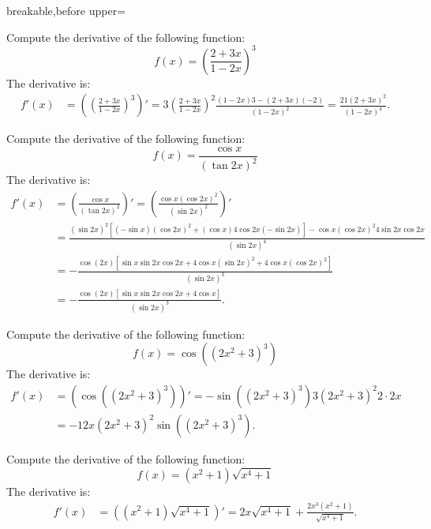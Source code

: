 \begin{dispListing*}{breakable,before upper=}
\begin{exercise}
  Compute the derivative of the following function:
  \begin{equation*}
    f(x)=\left(\frac{2+3x}{1-2x}\right)^3
  \end{equation*}
\tcblower
  The derivative is:
  \begin{align*}
    f'(x) &= \left( \left(\frac{2+3x}{1-2x}\right)^3 \right)'
    = 3 \left(\frac{2+3x}{1-2x}\right)^2 \frac{(1-2x)3-(2+3x)(-2)}{(1-2x)^2}
    = \frac{21(2+3x)^2}{(1-2x)^4}.
  \end{align*}
\end{exercise}

\begin{exercise}
  Compute the derivative of the following function:
  \begin{equation*}
    f(x)=\frac{\cos x}{(\tan 2x)^2}
  \end{equation*}
\tcblower
  The derivative is:
  \begin{align*}
    f'(x) &= \left( \frac{\cos x}{(\tan 2x)^2} \right)'
    = \left( \frac{\cos x (\cos 2x)^2}{(\sin 2x)^2} \right)'\\
    &= \frac{(\sin 2x)^2 [(-\sin x)(\cos 2x)^2+(\cos x)4\cos 2x (-\sin 2x)]
       - \cos x (\cos 2x)^2 4\sin 2x \cos 2x}{(\sin 2x)^4}\\
    &= -\frac{\cos(2x) [\sin x \sin 2x \cos 2x+ 4\cos x(\sin 2x)^2
       + 4 \cos x (\cos 2x)^2]}{(\sin 2x)^3}\\
    &= -\frac{\cos(2x) [\sin x \sin 2x \cos 2x+ 4\cos x]}{(\sin 2x)^3}.
  \end{align*}
\end{exercise}

\begin{exercise}
  Compute the derivative of the following function:
  \begin{equation*}
    f(x)=\cos((2x^2+3)^3)
  \end{equation*}
\tcblower
  The derivative is:
  \begin{align*}
    f'(x) &= \left( \cos((2x^2+3)^3) \right)'
    =-\sin((2x^2+3)^3) 3(2x^2+3)^2 2\cdot 2x\\
    &=-12x(2x^2+3)^2\sin((2x^2+3)^3).
  \end{align*}
\end{exercise}

\begin{exercise}
  Compute the derivative of the following function:
  \begin{equation*}
    f(x)=(x^2+1)\sqrt{x^4+1}
  \end{equation*}
\tcblower
  The derivative is:
  \begin{align*}
    f'(x) &= \left( (x^2+1)\sqrt{x^4+1} \right)'
    = 2x\sqrt{x^4+1} + \frac{2x^3(x^2+1)}{\sqrt{x^4+1}}.
  \end{align*}
\end{exercise}

\tcbstoprecording
\end{dispListing*}
\tcbusetemp


